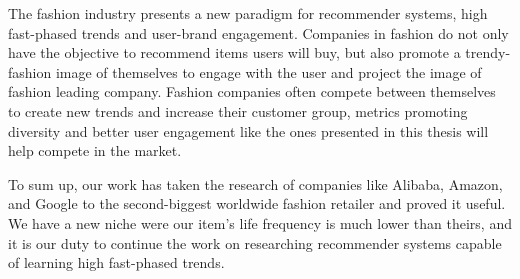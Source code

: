 \documentclass{kththesis}
\begin{document}
The fashion industry presents a new paradigm for recommender systems, high fast-phased trends and user-brand engagement. Companies in fashion do not only have the objective to recommend items users will buy, but also promote a trendy-fashion image of themselves to engage with the user and project the image of fashion leading company. Fashion companies often compete between themselves to create new trends and increase their customer group, metrics promoting diversity and better user engagement like the ones presented in this thesis will help compete in the market.

To sum up, our work has taken the research of companies like Alibaba, Amazon, and Google to the second-biggest worldwide fashion retailer and proved it useful. We have a new niche were our item's life frequency is much lower than theirs, and it is our duty to continue the work on researching recommender systems capable of learning high fast-phased trends.

\printbibliography
\end{document}
